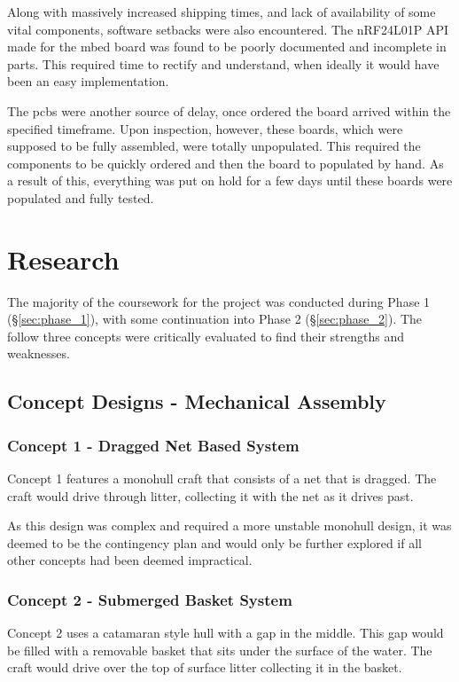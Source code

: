 \documentclass [11pt]{article}
\begin{document}
Along with massively increased shipping times, and lack of availability of some vital components, software setbacks were also encountered. The nRF24L01P API made for the \gls{mbed} board was found to be poorly documented and incomplete in parts. This required time to rectify and understand, when ideally it would have been an easy implementation. 

The \gls{pcb}s were another source of delay, once ordered the board arrived within the specified timeframe. Upon inspection, however, these boards, which were supposed to be fully assembled, were totally unpopulated. This required the components to be quickly ordered and then the board to populated by hand. As a result of this, everything was put on hold for a few days until these boards were populated and fully tested. 

\section{Research}

The majority of the coursework for the project was conducted during Phase 1 (§\ref{sec:phase_1}), with some continuation into Phase 2 (§\ref{sec:phase_2}). The follow three concepts were critically evaluated to find their strengths and weaknesses. 

\subsection{Concept Designs - Mechanical Assembly}
\subsubsection{Concept 1 - Dragged Net Based System}
Concept 1 features a monohull craft that consists of a net that is dragged. The craft would drive through litter, collecting it with the net as it drives past. 

As this design was complex and required a more unstable monohull design, it was deemed to be the contingency plan and would only be further explored if all other concepts had been deemed impractical.

\subsubsection{Concept 2 - Submerged Basket System}
Concept 2 uses a catamaran style hull with a gap in the middle. This gap would be filled with a removable basket that sits under the surface of the water. The craft would drive over the top of surface litter collecting it in the basket.  
\end{document}
